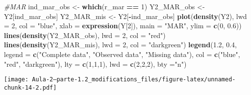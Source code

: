 \documentclass[
]{article}
\newenvironment{Shaded}{\begin{snugshade}}{\end{snugshade}}
\newcommand{\AttributeTok}[1]{\textcolor[rgb]{0.13,0.29,0.53}{#1}}
\newcommand{\CommentTok}[1]{\textcolor[rgb]{0.56,0.35,0.01}{\textit{#1}}}
\newcommand{\DecValTok}[1]{\textcolor[rgb]{0.00,0.00,0.81}{#1}}
\newcommand{\FloatTok}[1]{\textcolor[rgb]{0.00,0.00,0.81}{#1}}
\newcommand{\FunctionTok}[1]{\textcolor[rgb]{0.13,0.29,0.53}{\textbf{#1}}}
\newcommand{\NormalTok}[1]{#1}
\newcommand{\OtherTok}[1]{\textcolor[rgb]{0.56,0.35,0.01}{#1}}
\newcommand{\SpecialCharTok}[1]{\textcolor[rgb]{0.81,0.36,0.00}{\textbf{#1}}}
\newcommand{\StringTok}[1]{\textcolor[rgb]{0.31,0.60,0.02}{#1}}
\begin{document}
\begin{Shaded}
\begin{Highlighting}[]
\CommentTok{\#MAR}
\NormalTok{ind\_mar\_obs }\OtherTok{\textless{}{-}} \FunctionTok{which}\NormalTok{(r\_mar }\SpecialCharTok{==} \DecValTok{1}\NormalTok{)}
\NormalTok{Y2\_MAR\_obs }\OtherTok{\textless{}{-}}\NormalTok{ Y2[ind\_mar\_obs]}
\NormalTok{Y2\_MAR\_mis }\OtherTok{\textless{}{-}}\NormalTok{ Y2[}\SpecialCharTok{{-}}\NormalTok{ind\_mar\_obs]}
\FunctionTok{plot}\NormalTok{(}\FunctionTok{density}\NormalTok{(Y2), }\AttributeTok{lwd =} \DecValTok{2}\NormalTok{, }\AttributeTok{col =} \StringTok{"blue"}\NormalTok{, }\AttributeTok{xlab =} \FunctionTok{expression}\NormalTok{(Y[}\DecValTok{2}\NormalTok{]), }\AttributeTok{main =} \StringTok{"MAR"}\NormalTok{, }\AttributeTok{ylim =} \FunctionTok{c}\NormalTok{(}\DecValTok{0}\NormalTok{, }\FloatTok{0.6}\NormalTok{))}
\FunctionTok{lines}\NormalTok{(}\FunctionTok{density}\NormalTok{(Y2\_MAR\_obs), }\AttributeTok{lwd =} \DecValTok{2}\NormalTok{, }\AttributeTok{col =} \StringTok{"red"}\NormalTok{)}
\FunctionTok{lines}\NormalTok{(}\FunctionTok{density}\NormalTok{(Y2\_MAR\_mis), }\AttributeTok{lwd =} \DecValTok{2}\NormalTok{, }\AttributeTok{col =} \StringTok{"darkgreen"}\NormalTok{)}
\FunctionTok{legend}\NormalTok{(}\FloatTok{1.2}\NormalTok{, }\FloatTok{0.4}\NormalTok{, }\AttributeTok{legend =} \FunctionTok{c}\NormalTok{(}\StringTok{"Complete data"}\NormalTok{, }\StringTok{"Observed data"}\NormalTok{, }\StringTok{"Missing data"}\NormalTok{), }
       \AttributeTok{col =} \FunctionTok{c}\NormalTok{(}\StringTok{"blue"}\NormalTok{, }\StringTok{"red"}\NormalTok{, }\StringTok{"darkgreen"}\NormalTok{), }\AttributeTok{lty =} \FunctionTok{c}\NormalTok{(}\DecValTok{1}\NormalTok{,}\DecValTok{1}\NormalTok{,}\DecValTok{1}\NormalTok{), }\AttributeTok{lwd =} \FunctionTok{c}\NormalTok{(}\DecValTok{2}\NormalTok{,}\DecValTok{2}\NormalTok{,}\DecValTok{2}\NormalTok{), }\AttributeTok{bty =}\StringTok{"n"}\NormalTok{)}
\end{Highlighting}
\end{Shaded}

\texttt{[image: Aula-2---parte-1.2\_modifications\_files/figure-latex/unnamed-chunk-14-2.pdf]}
\end{document}
